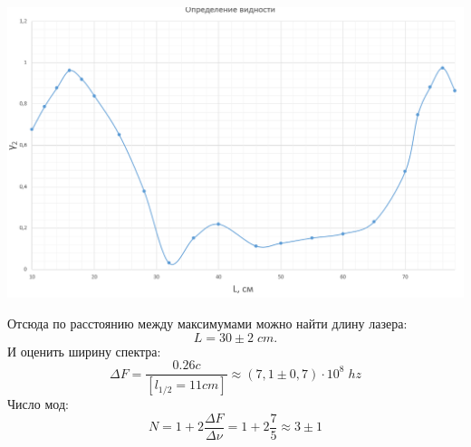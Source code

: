 \documentclass[12pt,a4paper]{article}
\begin{document}
\begin{center}
\includegraphics[scale=0.6]{452_graph2.png}
\end{center}
 
Отсюда по расстоянию между максимумами можно найти длину лазера:
\[L = 30 \pm 2 \; cm.\]
И оценить ширину спектра:
\[\Delta F = \frac{0.26 c}{[l_{1/2} = 11cm]} \approx (7,1 \pm 0,7) \cdot 10^8  \; hz\]
Число мод:
\[N = 1 + 2 \frac{\Delta F}{\Delta \nu} = 1 + 2 \frac{7}{5} \approx 3 \pm 1 \]
\end{document}

